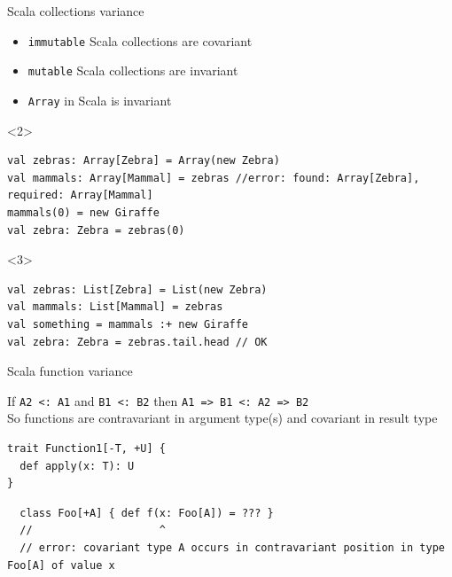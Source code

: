 \documentclass[aspectratio=169]{beamer}
\begin{document}
\begin{frame}[fragile]{Scala collections variance}
\begin{itemize}
  \item \texttt{immutable} Scala collections are \alert{covariant}
  \item \texttt{mutable} Scala collections are \alert{invariant}
  \item \texttt{Array} in Scala is \alert{invariant}
\end{itemize}
\begin{onlyenv}<2>
  \vspace{2em}
\begin{verbatim}
val zebras: Array[Zebra] = Array(new Zebra)
val mammals: Array[Mammal] = zebras //error: found: Array[Zebra], required: Array[Mammal]
mammals(0) = new Giraffe
val zebra: Zebra = zebras(0)
\end{verbatim}
\end{onlyenv}
\begin{onlyenv}<3>
  \vspace{2em}
\begin{verbatim}
val zebras: List[Zebra] = List(new Zebra)
val mammals: List[Mammal] = zebras
val something = mammals :+ new Giraffe
val zebra: Zebra = zebras.tail.head // OK
\end{verbatim}
\end{onlyenv}
\end{frame}

\begin{frame}[fragile]{Scala function variance}
\vspace{-2em}
\begin{block}{}
If \texttt{A2 <: A1} and \texttt{B1 <: B2} then \texttt{A1 => B1 <: A2 => B2} \\
So functions are contravariant in argument type(s) and covariant in result type
\end{block}
\vspace{1em}
\begin{verbatim}
trait Function1[-T, +U] {
  def apply(x: T): U
}
\end{verbatim}
\pause
\vspace{1em}
\begin{verbatim}
  class Foo[+A] { def f(x: Foo[A]) = ??? }
  //                    ^
  // error: covariant type A occurs in contravariant position in type Foo[A] of value x
\end{verbatim}
\end{frame}
\end{document}
